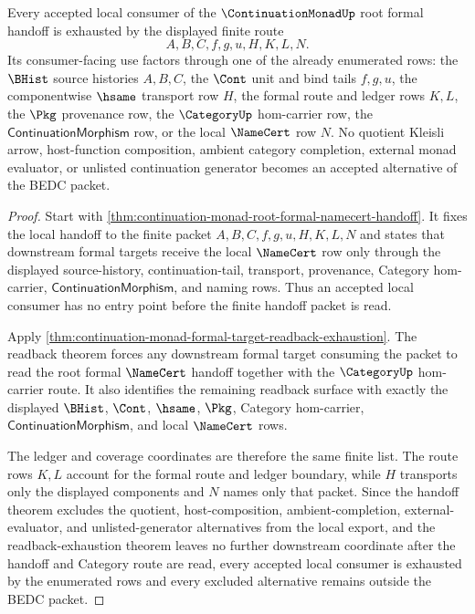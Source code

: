 \begin{theorem}
\label{thm:continuation-monad-root-formal-handoff-downstream-coverage}
Every accepted local consumer of the $\ContinuationMonadUp$ root formal handoff is exhausted by the displayed finite route
$$
A,B,C,f,g,u,H,K,L,N.
$$
Its consumer-facing use factors through one of the already enumerated rows: the $\BHist$ source histories $A,B,C$, the $\Cont$ unit and bind tails $f,g,u$, the componentwise $\hsame$ transport row $H$, the formal route and ledger rows $K,L$, the $\Pkg$ provenance row, the $\CategoryUp$ hom-carrier row, the $\mathsf{ContinuationMorphism}$ row, or the local $\NameCert$ row $N$. No quotient Kleisli arrow, host-function composition, ambient category completion, external monad evaluator, or unlisted continuation generator becomes an accepted alternative of the BEDC packet.
\end{theorem}
\begin{proof}
Start with \autoref{thm:continuation-monad-root-formal-namecert-handoff}. It fixes the local handoff to the finite packet $A,B,C,f,g,u,H,K,L,N$ and states that downstream formal targets receive the local $\NameCert$ row only through the displayed source-history, continuation-tail, transport, provenance, Category hom-carrier, $\mathsf{ContinuationMorphism}$, and naming rows. Thus an accepted local consumer has no entry point before the finite handoff packet is read.

Apply \autoref{thm:continuation-monad-formal-target-readback-exhaustion}. The readback theorem forces any downstream formal target consuming the packet to read the root formal $\NameCert$ handoff together with the $\CategoryUp$ hom-carrier route. It also identifies the remaining readback surface with exactly the displayed $\BHist$, $\Cont$, $\hsame$, $\Pkg$, Category hom-carrier, $\mathsf{ContinuationMorphism}$, and local $\NameCert$ rows.

The ledger and coverage coordinates are therefore the same finite list. The route rows $K,L$ account for the formal route and ledger boundary, while $H$ transports only the displayed components and $N$ names only that packet. Since the handoff theorem excludes the quotient, host-composition, ambient-completion, external-evaluator, and unlisted-generator alternatives from the local export, and the readback-exhaustion theorem leaves no further downstream coordinate after the handoff and Category route are read, every accepted local consumer is exhausted by the enumerated rows and every excluded alternative remains outside the BEDC packet.
\end{proof}
